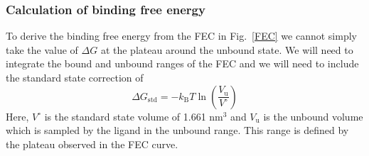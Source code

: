 \subsubsection{Calculation of binding free energy}

To derive the binding free energy from the FEC in Fig.~\ref{FEC} we cannot simply take the value of $\Delta G$ at the plateau around the unbound state. We will need to integrate the bound and unbound ranges of the FEC and we will need to include the standard state correction of 
\begin{equation}
\Delta G_{\text{std}} = -k_{\text{B}}T \ln \left (\frac{V_{\text{u}}}{V^{\circ}} \right )
\end{equation}
Here, $V^{\circ}$ is the standard state volume of 1.661 nm$^3$ and $V_{\text{u}}$ is the unbound volume which is sampled by the ligand in the unbound range.
This range is defined by the plateau observed in the FEC curve.  

